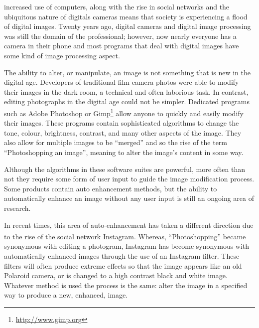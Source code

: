 \documentclass[journal,transmag]{IEEEtran}
\begin{document}

 increased use of computers, along with the rise in social networks and the ubiquitous nature of digitals cameras means that society is experiencing a flood of digital images.  Twenty years ago, digital cameras and digital image processing was still the domain of the professional; however, now nearly everyone has a camera in their phone and most programs that deal with digital images have some kind of image processing aspect. 

The ability to alter, or manipulate, an image is not something that is new in the digital age.  Developers of traditional film camera photos were able to modify their images in the dark room, a technical and often laborious task.  In contrast, editing photographs in the digital age could not be simpler.  Dedicated programs such as Adobe\textsuperscript{\texttrademark} Photoshop\textsuperscript{\textregistered} or Gimp\footnote{\url{http://www.gimp.org}} allow anyone to quickly and easily modify their images.  These programs contain sophisticated algorithms to change the tone, colour, brightness, contrast, and many other aspects of the image.  They also allow for multiple images to be ``merged'' and so the rise of the term ``Photoshopping an image'', meaning to alter the image's content in some way.

Although the algorithms in these software suites are powerful, more often than not they require some form of user input to guide the image modification process.  Some products contain auto enhancement methods, but the ability to automatically enhance an image without any user input is still an ongoing area of research.

In recent times, this area of auto-enhancement has taken a different direction due to the rise of the social network Instagram\textsuperscript{\texttrademark}.  Whereas, ``Photoshopping'' became synonymous with editing a photogram, Instagram has become synonymous with automatically enhanced images through the use of an Instagram filter.  These filters will often produce extreme effects so that the image appears like an old Polaroid camera, or is changed to a high contrast black and white image.  Whatever method is used the process is the same: alter the image in a specified way to produce a new, enhanced, image.
\end{document}
